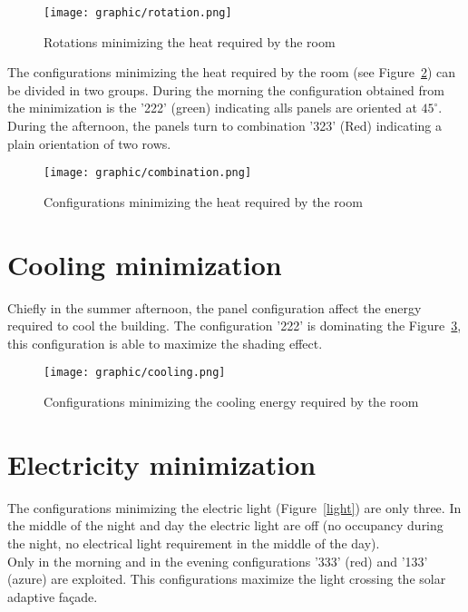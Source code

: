 \begin{figure}[h]
 \centering
 \texttt{[image: graphic/rotation.png]}
 \caption{Rotations minimizing the heat required by the room}
 \label{rotation}
\end{figure}

The configurations minimizing the heat required by the room (see Figure~\ref{configuartions}) can be divided in two groups. During the morning the configuration obtained from the minimization is the '222' (green) indicating alls panels are oriented at $45 ^\circ$. During the afternoon, the panels turn to combination '323' (Red) indicating a plain orientation of two rows.

\begin{figure}[h]
 \centering
 \texttt{[image: graphic/combination.png]}
 \caption{Configurations minimizing the heat required by the room}
 \label{configuartions}
\end{figure}

\newpage

\section{Cooling minimization}

Chiefly in the summer afternoon, the panel configuration affect the energy required to cool the building. The configuration '222' is dominating the Figure~\ref{cooling}, this configuration is able to maximize the shading effect.

\begin{figure}[h]
 \centering
 \texttt{[image: graphic/cooling.png]}
 \caption{Configurations minimizing the cooling energy required by the room}
 \label{cooling}
\end{figure}

\newpage

\section{Electricity minimization}

The configurations minimizing the electric light (Figure~\ref{light}) are only three. In the middle of the night and day the electric light are off (no occupancy during the night, no electrical light requirement in the middle of the day).\\
Only in the morning and in the evening configurations '333' (red) and '133' (azure) are exploited. This configurations maximize the light crossing the solar adaptive fa\c{c}ade.

